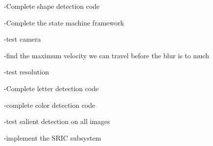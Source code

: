 -\/\-Complete shape detection code

-\/\-Complete the state machine framework

-\/test camera \begin{DoxyVerb}-find the maximum velocity we can travel before the blur is to much

-test resolution
\end{DoxyVerb}


-\/\-Complete letter detection code

-\/complete color detection code

-\/test salient detection on all images

-\/implement the S\-R\-I\-C subsystem 